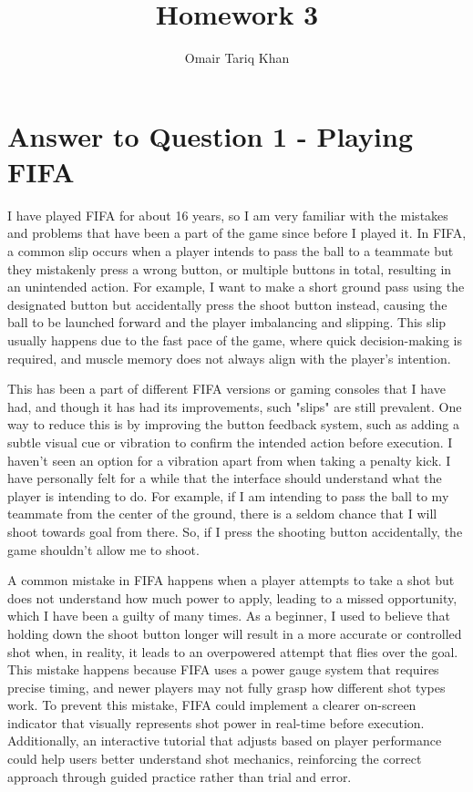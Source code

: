 \documentclass[
	letterpaper, %
]{jdf}
\author{Omair Tariq Khan}
\title{Homework 3}
\begin{document}

\maketitle
\hfill \break
\hfill \break


\section{Answer to Question 1 - Playing FIFA}
I have played FIFA for about 16 years, so I am very familiar with the mistakes and problems that have been a part of the game since before I played it. In FIFA, a common slip occurs when a player intends to pass the ball to a teammate but they mistakenly press a wrong button, or multiple buttons in total, resulting in an unintended action. For example, I want to make a short ground pass using the designated button but accidentally press the shoot button instead, causing the ball to be launched forward and the player imbalancing and slipping. This slip usually happens due to the fast pace of the game, where quick decision-making is required, and muscle memory does not always align with the player's intention. 

This has been a part of different FIFA versions or gaming consoles that I have had, and though it has had its improvements, such "slips" are still prevalent. One way to reduce this is by improving the button feedback system, such as adding a subtle visual cue or vibration to confirm the intended action before execution. I haven't seen an option for a vibration apart from when taking a penalty kick. I have personally felt for a while that the interface should understand what the player is intending to do. For example, if I am intending to pass the ball to my teammate from the center of the ground, there is a seldom chance that I will shoot towards goal from there. So, if I press the shooting button accidentally, the game shouldn't allow me to shoot. 

A common mistake in FIFA happens when a player attempts to take a shot but does not understand how much power to apply, leading to a missed opportunity, which I have been a guilty of many times. As a beginner, I used to believe that holding down the shoot button longer will result in a more accurate or controlled shot when, in reality, it leads to an overpowered attempt that flies over the goal. This mistake happens because FIFA uses a power gauge system that requires precise timing, and newer players may not fully grasp how different shot types work. To prevent this mistake, FIFA could implement a clearer on-screen indicator that visually represents shot power in real-time before execution. Additionally, an interactive tutorial that adjusts based on player performance could help users better understand shot mechanics, reinforcing the correct approach through guided practice rather than trial and error.
\end{document}
